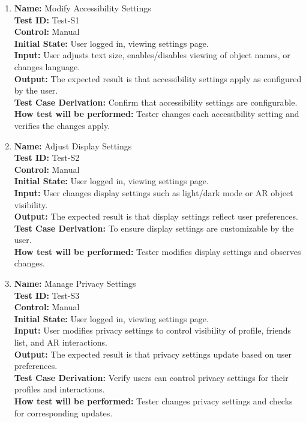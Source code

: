 \documentclass[12pt, titlepage]{article}
\begin{document}
\begin{enumerate}

    \item \textbf{Name:} {Modify Accessibility Settings} \label{itm:Test-S1}\\
    \textbf{Test ID:} Test-S1\\
    \textbf{Control:} Manual \\
    \textbf{Initial State:} User logged in, viewing settings page. \\
    \textbf{Input:} User adjusts text size, enables/disables viewing of object names, or changes language. \\
    \textbf{Output:} The expected result is that accessibility settings apply as configured by the user. \\
    \textbf{Test Case Derivation:} Confirm that accessibility settings are configurable. \\
    \textbf{How test will be performed:} Tester changes each accessibility setting and verifies the changes apply.

    \item \textbf{Name:} {Adjust Display Settings} \label{itm:Test-S2}\\
    \textbf{Test ID:} Test-S2\\
    \textbf{Control:} Manual \\
    \textbf{Initial State:} User logged in, viewing settings page. \\
    \textbf{Input:} User changes display settings such as light/dark mode or AR object visibility. \\
    \textbf{Output:} The expected result is that display settings reflect user preferences. \\
    \textbf{Test Case Derivation:} To ensure display settings are customizable by the user. \\
    \textbf{How test will be performed:} Tester modifies display settings and observes changes.

    \item \textbf{Name:} {Manage Privacy Settings} \label{itm:Test-S3}\\
    \textbf{Test ID:} Test-S3\\
    \textbf{Control:} Manual \\
    \textbf{Initial State:} User logged in, viewing settings page. \\
    \textbf{Input:} User modifies privacy settings to control visibility of profile, friends list, and AR interactions. \\
    \textbf{Output:} The expected result is that privacy settings update based on user preferences. \\
    \textbf{Test Case Derivation:} Verify users can control privacy settings for their profiles and interactions. \\
    \textbf{How test will be performed:} Tester changes privacy settings and checks for corresponding updates.


\end{enumerate}
\end{document}
